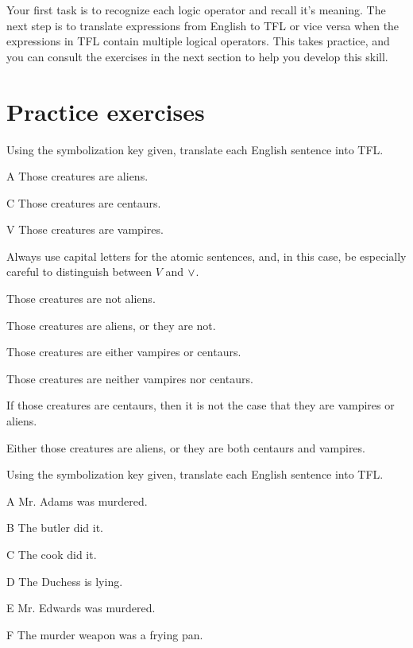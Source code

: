\noindent Your first task is to recognize each logic operator and recall it's meaning. The next step is to translate expressions from English to TFL or vice versa when the expressions in TFL contain multiple logical operators. This takes practice, and you can consult the exercises in the next section to help you develop this skill.




\filbreak
\section{Practice exercises}
\setcounter{ProbPart}{0}

\problempart Using the symbolization key given, translate each English sentence into TFL.\label{pr.monkeysuits}
	\begin{ekey}
		\item[A] Those creatures are aliens. 
		\item[C] Those creatures are centaurs. 
		\item[V] Those creatures are vampires.
	\end{ekey}
Always use capital letters for the atomic sentences, and, in this case, be especially careful to distinguish between $V$ and $\vee$.

\begin{earg}
\item Those creatures are not aliens.
\item Those creatures are aliens, or they are not.
\item Those creatures are either vampires or centaurs.
\item Those creatures are neither vampires nor centaurs.
\item If those creatures are centaurs, then it is not the case that they are vampires or aliens.
\item Either those creatures are aliens, or they are both centaurs and vampires.
\end{earg}

\problempart Using the symbolization key given, translate each English sentence into TFL.
\begin{ekey}
\item[A] Mr. Adams was murdered.
\item[B] The butler did it.
\item[C] The cook did it.
\item[D] The Duchess is lying.
\item[E] Mr. Edwards was murdered.
\item[F] The murder weapon was a frying pan.
\end{ekey}

